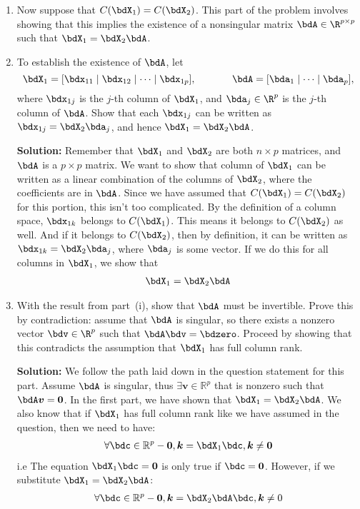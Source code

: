 \begin{enumerate}
\item Now suppose that $C(\bdX_1) = C(\bdX_2)$.
This part of the problem involves
showing that this implies the existence of a nonsingular matrix
$\bdA \in \R^{p\times p}$ 
such that $\bdX_1 = \bdX_2 \bdA$.
\be
\item To establish the existence of $\bdA$, let 
\[
\bdX_1 = [\bdx_{11} \mid \bdx_{12} \mid \cdots \mid \bdx_{1p}],
\hspace{0.5in}
\bdA = [\bda_1 \mid \cdots \mid \bda_p],
\]
where $\bdx_{1j}$ is the $j$-th column of $\bdX_1$,
and $\bda_j \in \R^p$ is the $j$-th column of $\bdA$.
Show that each
$\bdx_{1j}$ can be written as 
$\bdx_{1j} = \bdX_2 \bda_j$, and hence $\bdX_1 = \bdX_2\bdA$.

\begin{hwanswer}
	\textbf{Solution: } Remember that $\bdX_1$ and $\bdX_2$ are both $n \times p$ matrices, and $\bdA$ is a $p \times p$ matrix. We want to show that column of $\bdX_1$ can be written as a linear combination of the columns of $\bdX_2$, where the coefficients are in $\bdA$. Since we have assumed that $C(\bdX_1)=C(\bdX_2)$ for this portion, this isn't too complicated. By the definition of a column space, $\bdx_{1k}$ belongs to $C(\bdX_1)$. This means it belongs to $C(\bdX_2)$ as well. And if it belongs to $C(\bdX_2)$, then by definition, it can be written as $\bdx_{1k} = \bdX_2 \bda_j$, where $\bda_j$ is some vector. If we do this for all columns in $\bdX_1$, we show that 
\begin{align*}
	\bdX_1 = \bdX_2 \bdA
\end{align*}
\end{hwanswer}

\item With the result from part~(i), 
show that $\bdA$ must be invertible.
Prove this by contradiction:
assume that $\bdA$ is
singular, so there exists a nonzero vector $\bdv \in \R^p$ 
such that $\bdA\bdv = \bdzero$.
Proceed by showing that this contradicts the assumption that $\bdX_1$
has full column rank.

\begin{hwanswer}
	\textbf{Solution: } We follow the path laid down in the question statement for this part. Assume $\bdA$ is singular, thus $\exists \bm v \in \mathbb R^p$ that is nonzero such that $\bdA \bm v= \bm 0$. In the first part, we have shown that $\bdX_1 = \bdX_2 \bdA$. We also know that if $\bdX_1$ has full column rank like we have assumed in the question, then we need to have:
\begin{align*}
	\forall \bdc \in \mathbb R^p - \bm 0, \bm k =  \bdX_1 \bdc, \bm k \neq \bm 0
\end{align*}
i.e
The equation $\bdX_1\bdc = \bm 0$ is only true if $\bdc = \bm 0$.
However, if we substitute $\bdX_1 = \bdX_2 \bdA$:
\begin{align*}
	\forall \bdc \in \mathbb R^p - \bm 0, \bm k = \bdX_2 \bdA \bdc, \bm k \neq 0
\end{align*}


\end{hwanswer}
\end{enumerate}
